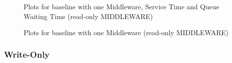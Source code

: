 \documentclass[11pt,a4paper]{article}
\begin{document}
\begin{figure}[!h]
  \centering
    \caption{Plots for baseline with one Middleware, Service Time and Queue Waiting Time (read-only MIDDLEWARE)}
  \label{fig:baseline_mw_1_mw_mw_c_ro}
\end{figure}

\begin{figure}[!h]
  \centering
    \caption{Plots for baseline with one Middleware (read-only MIDDLEWARE)}
  \label{fig:baseline_mw_1_mw_mw_ro}
\end{figure}

\subsubsection*{Write-Only}
\end{document}
